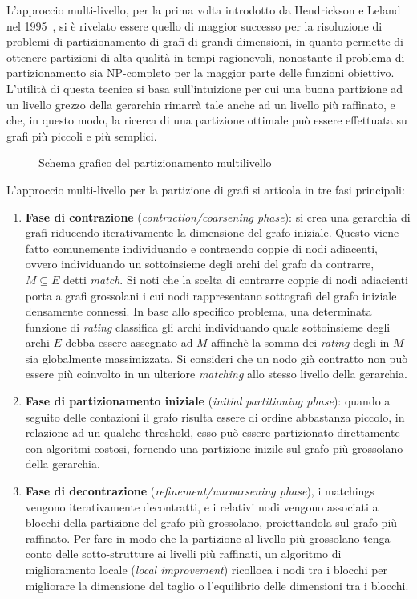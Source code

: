 L'approccio multi-livello, per la prima volta introdotto da Hendrickson e Leland nel
1995~\cite{Hendrickson1995}, si \`e rivelato essere quello di maggior successo per la risoluzione
di problemi di partizionamento di grafi di grandi dimensioni, in quanto permette di ottenere partizioni di alta
qualit\`a in tempi ragionevoli, nonostante il problema di partizionamento sia NP-completo per la maggior parte delle
funzioni obiettivo.
L'utilit\`a di questa tecnica si basa sull'intuizione per cui una buona partizione ad un livello grezzo della
gerarchia rimarr\`a tale anche ad un livello pi\`u raffinato, e che, in questo modo, la ricerca di una
partizione ottimale pu\`o essere effettuata su grafi pi\`u piccoli e pi\`u semplici.
\newpage

\begin{figure}
    \centering
    
    \caption{Schema grafico del partizionamento multilivello}
    \label{fig:multi-level-graph-partitioning}
\end{figure}

L'approccio multi-livello per la partizione di grafi si articola in tre fasi principali:
\begin{enumerate}
    \item \textbf{Fase di contrazione} (\textit{contraction/coarsening phase}):
    si crea una gerarchia di grafi riducendo iterativamente la dimensione del grafo iniziale.
    Questo viene fatto comunemente individuando e contraendo coppie di nodi adiacenti, ovvero individuando un
    sottoinsieme degli archi del grafo da contrarre, $M \subseteq E $ detti \textit{match}.
    Si noti che la scelta di contrarre coppie di nodi adiacienti porta a grafi grossolani i cui nodi rappresentano
    sottografi del grafo iniziale densamente connessi.
    In base allo specifico problema, una determinata funzione di \textit{rating} classifica gli archi individuando
    quale sottoinsieme degli archi $E$ debba essere assegnato ad $M$ affinch\`e la somma dei \textit{rating} degli in
    $M$ sia globalmente massimizzata.
    Si consideri che un nodo gi\`a contratto non pu\`o essere pi\`u coinvolto in un ulteriore \textit{matching}
    allo stesso livello della gerarchia.
    \item \textbf{Fase di partizionamento iniziale} (\textit{initial partitioning phase}): quando a seguito delle
    contazioni il grafo risulta essere di ordine abbastanza piccolo, in relazione ad un qualche threshold,
    esso pu\`o essere partizionato direttamente con algoritmi costosi, fornendo una partizione inizile sul grafo
    pi\`u grossolano della gerarchia.
    \item \textbf{Fase di decontrazione} (\textit{refinement/uncoarsening phase}), i matchings vengono iterativamente
    decontratti, e i relativi nodi vengono associati a blocchi della partizione del grafo pi\`u grossolano,
    proiettandola sul grafo pi\`u raffinato.
    Per fare in modo che la partizione al livello pi\`u grossolano tenga conto delle sotto-strutture ai livelli
    pi\`u raffinati, un algoritmo di miglioramento locale (\textit{local improvement}) ricolloca i nodi tra i
    blocchi per migliorare la dimensione del taglio o l'equilibrio delle dimensioni tra i blocchi.
\end{enumerate}